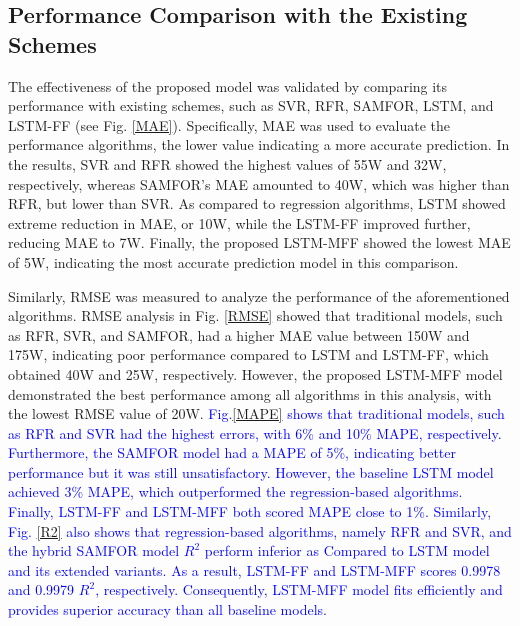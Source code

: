 \documentclass[journal]{IEEEtran}
\begin{document}
\subsection{Performance Comparison with the Existing Schemes }

The effectiveness of the proposed model was validated by comparing its performance with existing schemes, such as SVR, RFR, SAMFOR, LSTM, and LSTM-FF (see Fig. \ref{MAE}). Specifically, MAE was used to evaluate the performance algorithms, the lower value indicating a more accurate prediction. In the results, SVR and RFR showed the highest values of 55W and 32W, respectively, whereas SAMFOR's MAE amounted to 40W, which was higher than RFR, but lower than SVR. As compared to regression algorithms, LSTM showed extreme reduction in MAE, or 10W, while the LSTM-FF improved further, reducing MAE to 7W. Finally, the proposed LSTM-MFF showed the lowest MAE of 5W, indicating the most accurate prediction model in this comparison. 

Similarly, RMSE was measured to analyze the performance of the aforementioned algorithms.  RMSE analysis in Fig. \ref{RMSE} showed that traditional models, such as RFR, SVR, and SAMFOR, had a higher MAE value between 150W and 175W, indicating poor performance compared to LSTM and LSTM-FF, which obtained 40W and 25W, respectively. However, the proposed LSTM-MFF model demonstrated the best performance among all algorithms in this analysis, with the lowest RMSE value of 20W. \textcolor{blue}{Fig.\ref{MAPE} shows that traditional models, such as RFR and SVR had the highest errors, with 6\% and 10\% MAPE, respectively. Furthermore, the SAMFOR model had a MAPE of 5\%, indicating better performance but it was still unsatisfactory. However, the baseline LSTM model achieved 3\% MAPE, which outperformed the regression-based algorithms. Finally, LSTM-FF and LSTM-MFF both scored MAPE close to 1\%. 
Similarly, Fig. \ref{R2} also shows that regression-based algorithms, namely RFR and SVR, and the hybrid SAMFOR model $R^2$ perform inferior as Compared to LSTM model and its extended variants. As a result, LSTM-FF and LSTM-MFF scores 0.9978 and 0.9979 $R^2$, respectively. Consequently, LSTM-MFF model fits efficiently and provides superior accuracy than all baseline models.}
\end{document}
